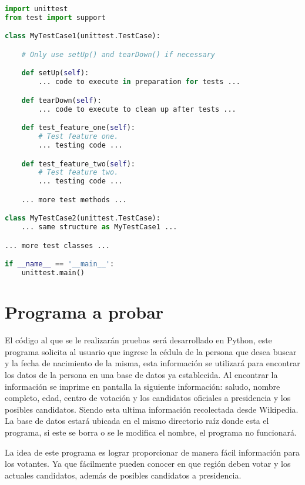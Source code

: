 \documentclass[conference]{IEEEtran}
\begin{document}
\begin{lstlisting}[language=Python,basicstyle=\scriptsize, breaklines=true,
    postbreak=\mbox{\textcolor{red}{$\hookrightarrow$}\space}]
import unittest
from test import support

class MyTestCase1(unittest.TestCase):

    # Only use setUp() and tearDown() if necessary

    def setUp(self):
        ... code to execute in preparation for tests ...

    def tearDown(self):
        ... code to execute to clean up after tests ...

    def test_feature_one(self):
        # Test feature one.
        ... testing code ...

    def test_feature_two(self):
        # Test feature two.
        ... testing code ...

    ... more test methods ...

class MyTestCase2(unittest.TestCase):
    ... same structure as MyTestCase1 ...

... more test classes ...

if __name__ == '__main__':
    unittest.main()

\end{lstlisting}


\section{Programa a probar}

El código al que se le realizarán pruebas será desarrollado en Python, este programa solicita al usuario que ingrese la cédula de la persona que desea buscar y la fecha de nacimiento de la misma, esta información se utilizará para encontrar los datos de la persona en una base de datos ya establecida. Al encontrar la información se imprime en pantalla la siguiente información: saludo, nombre completo, edad, centro de votación y los candidatos oficiales a presidencia y los posibles candidatos. Siendo esta ultima información recolectada desde Wikipedia. La base de datos estará ubicada en el mismo directorio raíz donde esta el programa, si este se borra o se le modifica el nombre, el programa no funcionará.

La idea de este programa es lograr proporcionar de manera fácil información para los votantes. Ya que fácilmente pueden conocer en que región deben votar y los actuales candidatos, además de posibles candidatos a presidencia.
\end{document}
